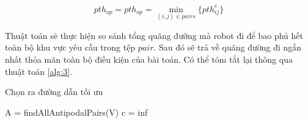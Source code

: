\begin{itemize}
    \begin{equation}
        pth_{op}=pth_{op}=\min_{(i,j)\in pairs}\{pth_{ij}^{e}\text{\}}
        \label{eq:optimalpath}
    \end{equation}

    Thuật toán sẽ thực hiện so sánh tổng quãng đường mà robot đi để bao phủ hết toàn bộ khu vực yêu cầu
    trong tệp $pair$. Sau đó sẽ trả về quãng đường đi ngắn nhất thỏa mãn toàn bộ điều kiện của bài toán. Có thể tóm tắt lại thông qua thuật toán \ref{alg:3}.
\end{itemize}

\begin{algorithm}
\caption{Chọn ra đường dẫn tối ưu}
\label{alg:3}
\SetAlgoLined
{}
A = findAllAntipodalPairs(V) \;
c = inf\;
\end{algorithm}